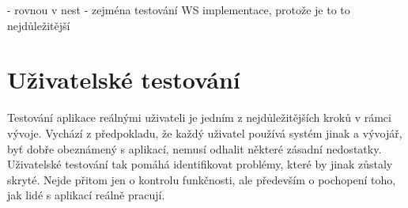 - rovnou v nest
- zejména testování WS implementace, protože je to to nejdůležitější







\section{Uživatelské testování}

Testování aplikace reálnými uživateli je jedním z nejdůležitějších kroků v rámci vývoje. 
Vychází z předpokladu, že každý uživatel používá systém jinak a vývojář, byť dobře obeznámený s aplikací, nemusí odhalit některé zásadní nedostatky. 
Uživatelské testování tak pomáhá identifikovat problémy, které by jinak zůstaly skryté. 
Nejde přitom jen o kontrolu funkčnosti, ale především o pochopení toho, jak lidé s aplikací reálně pracují.

